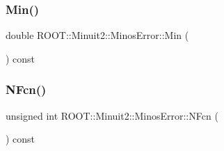 \subsubsection{\texorpdfstring{Min()}{Min()}\hspace{0.1cm}{\footnotesize\ttfamily [3/3]}}
{\footnotesize\ttfamily double R\+O\+O\+T\+::\+Minuit2\+::\+Minos\+Error\+::\+Min (\begin{DoxyParamCaption}{ }\end{DoxyParamCaption}) const\hspace{0.3cm}{\ttfamily [inline]}}

\mbox{\label{classROOT_1_1Minuit2_1_1MinosError_a4956b01f7899f42847617c378e5c86c2}} 
\subsubsection{\texorpdfstring{NFcn()}{NFcn()}\hspace{0.1cm}{\footnotesize\ttfamily [1/3]}}
{\footnotesize\ttfamily unsigned int R\+O\+O\+T\+::\+Minuit2\+::\+Minos\+Error\+::\+N\+Fcn (\begin{DoxyParamCaption}{ }\end{DoxyParamCaption}) const\hspace{0.3cm}{\ttfamily [inline]}}

